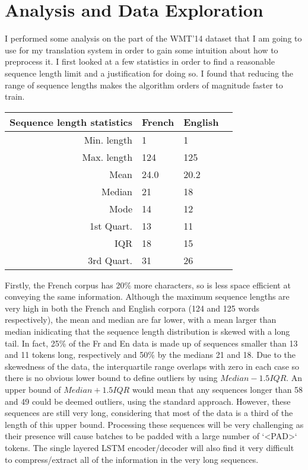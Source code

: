 \documentclass[]{article}
\begin{document}
\section{Analysis and Data Exploration}
I performed some analysis on the part of the WMT'14 dataset that I am going to use for my translation system in order to gain some intuition about how to preprocess it. I first looked at a few statistics in order to find a reasonable sequence length limit and a justification for doing so. I found that reducing the range of sequence lengths makes the algorithm orders of magnitude faster to train. 
\begin{tabular}{|r|l|l|r|}
	\hline
	Sequence length statistics             & French & English \\\hline
	Min. length  & 1      & 1    \\ \hline
	Max. length  & 124    & 125  \\ \hline
	Mean         & 24.0   & 20.2 \\ \hline
	Median       & 21     & 18   \\ \hline
	Mode         & 14     & 12   \\ \hline
	1st Quart.   & 13     & 11   \\ \hline
	IQR          & 18     & 15  \\ \hline
	3rd Quart.   & 31     & 26   \\ \hline
\end{tabular}
Firstly, the French corpus has 20\% more characters, so is less space efficient at conveying the same information.
Although the maximum sequence lengths are very high in both the French and English corpora (124 and 125 words respectively), the mean and median are far lower, with a mean larger than median inidicating that the sequence length distribution is skewed with a long tail. In fact, 25\% of the Fr and En data is made up of sequences smaller than 13 and 11 tokens long, respectively and 50\% by the medians 21 and 18. Due to the skewedness of the data, the interquartile range overlaps with zero in each case so there is no obvious lower bound to define outliers by using $Median-1.5IQR$. An upper bound of $Median+1.5IQR$ would mean that any sequences longer than 58 and 49 could be deemed outliers, using the standard approach. However, these sequences are still very long, considering that most of the data is a third of the length of this upper bound. Processing these sequences will be very challenging as their presence will cause batches to be padded with a large number of `<PAD>` tokens. The single layered LSTM encoder/decoder will also find it very difficult to compress/extract all of the information in the very long sequences.
\end{document}
